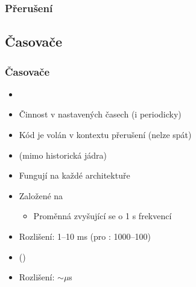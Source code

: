 
\begin{frame}
  \frametitle{Přerušení}


  \iffimuni
    \bigskip

    \tableofcontents
  \fi

\end{frame}


\iffimuni
\subsection{Časovače}
\fi

\begin{frame}
  \frametitle{Časovače}

  \begin{itemize}
    \item {}
    \item Činnost v nastavených časech (i periodicky)

    \pause

    \item Kód je volán v kontextu přerušení (nelze spát)
    \item {} (mimo historická jádra)
  \end{itemize}

  \pause

  \begin{itemize}
    \item Fungují na každé architektuře

    \pause

    \item Založené na 
    \begin{itemize}
      \item Proměnná zvyšující se o 1 s frekvencí 
    \end{itemize}

    \pause

    \item Rozlišení: 1--10 ms (pro : 1000--100)
  \end{itemize}

  \pause

  \begin{itemize}
    \item {} ()
    \item Rozlišení: $\sim \mu$s
  \end{itemize}

\end{frame}

